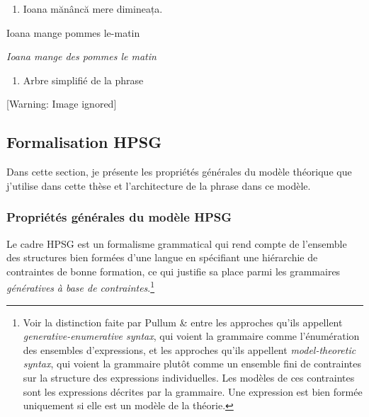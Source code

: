 \begin{enumerate}
\item \label{bkm:Ref307172433}Ioana  mănâncă  mere  dimineața.


\end{enumerate}
  Ioana  mange  pommes  le-matin

  \textit{Ioana mange des pommes le matin}


\begin{enumerate}
\item \label{bkm:Ref307172546}Arbre simplifié de la phrase 


\end{enumerate}
{   [Warning: Image ignored] %
} 

\subsection{Formalisation HPSG}
\label{bkm:Ref299354376}Dans cette section, je présente les propriétés générales du modèle théorique que j'utilise dans cette thèse et l'architecture de la phrase dans ce modèle. 

\subsubsection{Propriétés générales du modèle HPSG}
Le cadre HPSG est un formalisme grammatical qui rend compte de l'ensemble des structures bien formées d'une langue en spécifiant une hiérarchie de contraintes de bonne formation, ce qui justifie sa place parmi les grammaires \textit{génératives} \textit{à base de contraintes}.\footnote{Voir la distinction faite par Pullum \& \citet{Scholz2001} entre les approches qu'ils appellent \textit{generative-enumerative syntax}, qui voient la grammaire comme l'énumération des ensembles d'expressions, et les approches qu'ils appellent \textit{model-theoretic syntax}, qui voient la grammaire plutôt comme un ensemble fini de contraintes sur la structure des expressions individuelles. Les modèles de ces contraintes sont les expressions décrites par la grammaire. Une expression est bien formée uniquement si elle est un modèle de la théorie.}  

